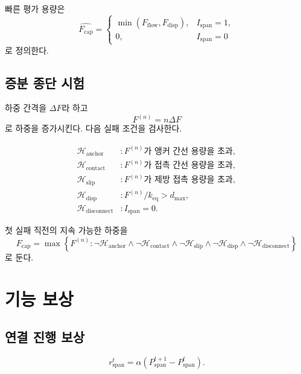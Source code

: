 \documentclass[11pt,a4paper]{article}
\newcommand{\Fcap}{F_{\mathrm{cap}}}
\newcommand{\Pspan}{P_{\mathrm{span}}}
\newcommand{\Ispan}{I_{\mathrm{span}}}
\begin{document}
빠른 평가 용량은
\begin{equation}
  \widehat{\Fcap}
  =
  \begin{cases}
    \min(F_{\mathrm{flow}},F_{\mathrm{disp}}),
      & \Ispan=1,\\
    0, & \Ispan=0
  \end{cases}
  \label{eq:fast-capacity}
\end{equation}
로 정의한다.

\subsection{증분 종단 시험}

하중 간격을 \(\Delta F\)라 하고
\begin{equation}
  F^{(n)}=n\Delta F
\end{equation}
로 하중을 증가시킨다. 다음 실패 조건을 검사한다.

\begin{align}
  \mathcal{H}_{\mathrm{anchor}}
    &: F^{(n)}\text{가 앵커 간선 용량을 초과},\\
  \mathcal{H}_{\mathrm{contact}}
    &: F^{(n)}\text{가 접촉 간선 용량을 초과},\\
  \mathcal{H}_{\mathrm{slip}}
    &: F^{(n)}\text{가 제방 접촉 용량을 초과},\\
  \mathcal{H}_{\mathrm{disp}}
    &: F^{(n)}/k_{\mathrm{eq}}>d_{\max},\\
  \mathcal{H}_{\mathrm{disconnect}}
    &: \Ispan=0.
\end{align}

첫 실패 직전의 지속 가능한 하중을
\begin{equation}
  \Fcap=
  \max\left\{
    F^{(n)}:
    \neg\mathcal{H}_{\mathrm{anchor}}
    \land
    \neg\mathcal{H}_{\mathrm{contact}}
    \land
    \neg\mathcal{H}_{\mathrm{slip}}
    \land
    \neg\mathcal{H}_{\mathrm{disp}}
    \land
    \neg\mathcal{H}_{\mathrm{disconnect}}
  \right\}
  \label{eq:terminal-capacity}
\end{equation}
로 둔다.

\section{기능 보상}

\subsection{연결 진행 보상}

\begin{equation}
  r_{\mathrm{span}}^t=
  \alpha\left(
    \Pspan^{t+1}-\Pspan^t
  \right).
  \label{eq:span-reward}
\end{equation}
\end{document}
